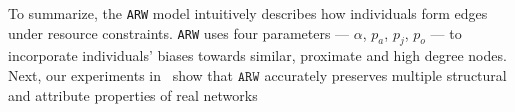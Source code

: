 


To summarize, the \texttt{ARW} model
intuitively describes how individuals form edges under resource constraints.
\texttt{ARW} uses four parameters --- $\alpha$, $p_a$, $p_j$, $p_o$ --- to incorporate
individuals' biases towards similar, proximate and high degree nodes.
Next, our experiments in~ show that $\texttt{ARW}$ accurately preserves
{multiple} structural and attribute properties of real networks

